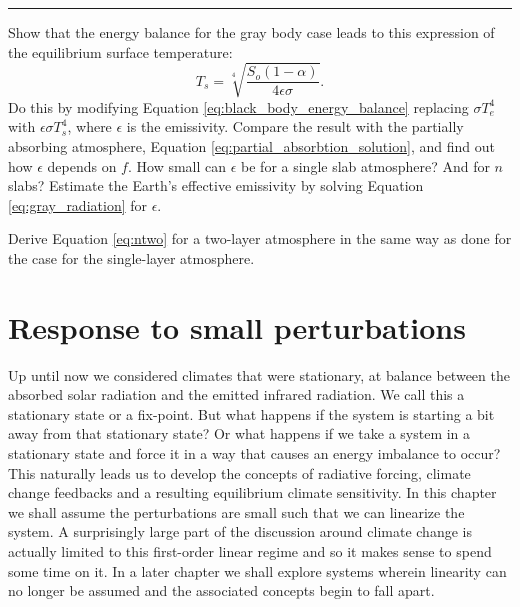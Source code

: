 \documentclass[12pt]{book}
\begin{document}
\vspace{1 cm}
{\setlength{\parindent}{0cm}
\hrule
\begin{exercise}
Show that the energy balance for the gray body case leads to this expression of the equilibrium surface temperature:
\begin{equation}
T_s = \sqrt[4]{\frac{S_o(1-\alpha)}{4\epsilon\sigma}}.
\label{eq:gray_radiation}
\end{equation}
Do this by modifying Equation \ref{eq:black_body_energy_balance} replacing $\sigma T_e^4$ with $\epsilon \sigma T_s^4$, where $\epsilon$ is the emissivity. Compare the result with the partially absorbing atmosphere, Equation \ref{eq:partial_absorbtion_solution}, and find out how $\epsilon$ depends on $f$. How small can $\epsilon$ be for a single slab atmosphere? And for $n$ slabs? Estimate the Earth's effective emissivity by solving Equation \ref{eq:gray_radiation} for $\epsilon$.
\end{exercise}

\begin{exercise}
Derive Equation \ref{eq:ntwo} for a two-layer atmosphere in the same way as done for the case for the single-layer atmosphere.
\end{exercise}


}

\chapter{Response to small perturbations}
\label{chapter:response}
\vspace{1 cm}

Up until now we considered climates that were stationary, at balance between the absorbed solar radiation and the emitted infrared radiation. We call this a stationary state or a fix-point. But what happens if the system is starting a bit away from that stationary state? Or what happens if we take a system in a stationary state and force it in a way that causes an energy imbalance to occur? This naturally leads us to develop the concepts of radiative forcing, climate change feedbacks and a resulting equilibrium climate sensitivity.
In this chapter we shall assume the perturbations are small such that we can linearize the system.  A surprisingly large part of the discussion around climate change is actually limited to this first-order linear regime and so it makes sense to spend some time on it. In a later chapter we shall explore systems wherein linearity can no longer be assumed and the associated concepts begin to fall apart.
\end{document}
